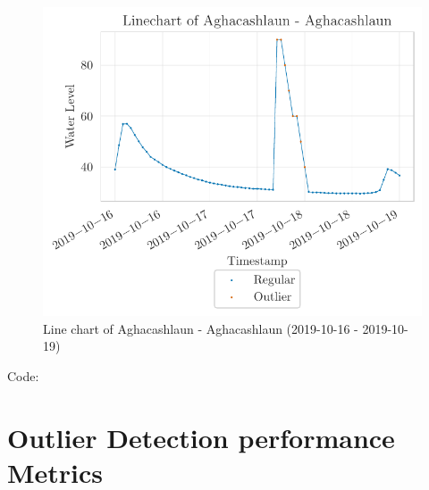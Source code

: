 \begin{figure}[htp]
    \centering
    \includegraphics{./plots/pdfs/36022-ie/slice_linechart_36022-ie.pdf}
    \caption{Line chart  of Aghacashlaun - Aghacashlaun (2019-10-16 - 2019-10-19)}
    \label{figure:linechart-zoomed-36022-ie}
\end{figure}


\par
Code: \cite{zelenayOutlierDetectionWater2022}
\clearpage

\section{Outlier Detection performance Metrics}
